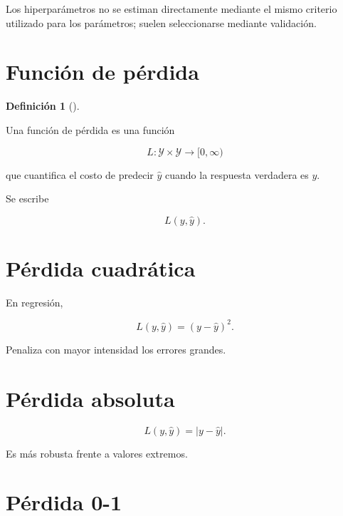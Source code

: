 \documentclass[
  spanish,
  10.5pt,
  letterpaper,
  DIV=11,
  numbers=noendperiod,
  oneside,
  open=any]{scrreprt}
\theoremstyle{definition}
\newtheorem{definition}{Definición}[chapter]
\theoremstyle{definition}
\theoremstyle{plain}
\theoremstyle{remark}
\begin{document}
Los hiperparámetros no se estiman directamente mediante el mismo
criterio utilizado para los parámetros; suelen seleccionarse mediante
validación.

\section*{Función de pérdida}\label{funciuxf3n-de-puxe9rdida}


\begin{definition}[]\protect\hypertarget{def-funcion-perdida}{}\label{def-funcion-perdida}

Una función de pérdida es una función

\[
L:\mathcal{Y}\times\mathcal{Y}\to[0,\infty)
\]

que cuantifica el costo de predecir \(\widehat{y}\) cuando la respuesta
verdadera es \(y\).

\end{definition}

Se escribe

\[
L(y,\widehat{y}).
\]

\section*{Pérdida cuadrática}\label{puxe9rdida-cuadruxe1tica-1}


En regresión,

\[
L(y,\widehat{y})
=
(y-\widehat{y})^2.
\]

Penaliza con mayor intensidad los errores grandes.

\section*{Pérdida absoluta}\label{puxe9rdida-absoluta-1}


\[
L(y,\widehat{y})
=
|y-\widehat{y}|.
\]

Es más robusta frente a valores extremos.

\section*{Pérdida 0-1}\label{puxe9rdida-0-1}
\end{document}
